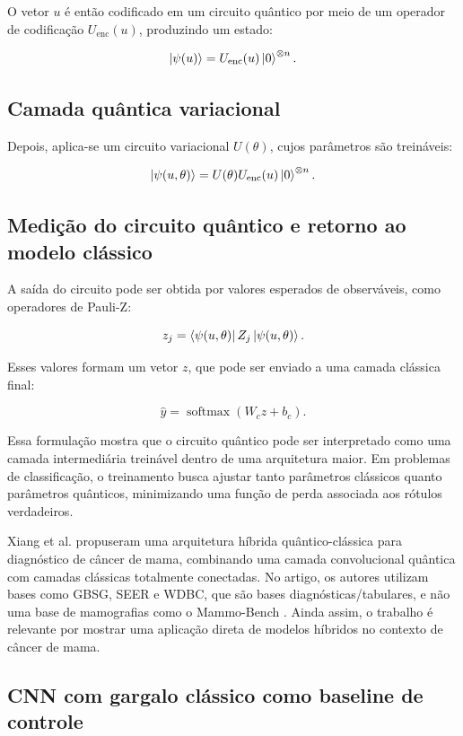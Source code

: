 \documentclass[
    12pt,
    openright,
    oneside,
    a4paper,
    english,
    brazil
]{abntex2}
\begin{document}
O vetor \(u\) é então codificado em um circuito quântico por meio de um operador de codificação \(U_{\text{enc}}(u)\), produzindo um estado:

\[
\ket{\psi(u)}
=
U_{\text{enc}}(u)
\ket{0}^{\otimes n}.
\]

\subsection{Camada quântica variacional}
\label{subsec:camada_quantica_variacional}

Depois, aplica-se um circuito variacional \(U(\theta)\), cujos parâmetros são treináveis:

\[
\ket{\psi(u,\theta)}
=
U(\theta)
U_{\text{enc}}(u)
\ket{0}^{\otimes n}.
\]

\subsection{Medição do circuito quântico e retorno ao modelo clássico}
\label{subsec:medicao_retorno_modelo_classico}

A saída do circuito pode ser obtida por valores esperados de observáveis, como operadores de Pauli-Z:

\[
z_j =
\bra{\psi(u,\theta)}
Z_j
\ket{\psi(u,\theta)}.
\]

Esses valores formam um vetor \(z\), que pode ser enviado a uma camada clássica final:

\[
\hat{y}
=
\operatorname{softmax}(W_c z + b_c).
\]

Essa formulação mostra que o circuito quântico pode ser interpretado como uma camada intermediária treinável dentro de uma arquitetura maior. Em problemas de classificação, o treinamento busca ajustar tanto parâmetros clássicos quanto parâmetros quânticos, minimizando uma função de perda associada aos rótulos verdadeiros.

Xiang et al. propuseram uma arquitetura híbrida quântico-clássica para diagnóstico de câncer de mama, combinando uma camada convolucional quântica com camadas clássicas totalmente conectadas. No artigo, os autores utilizam bases como GBSG, SEER e WDBC, que são bases diagnósticas/tabulares, e não uma base de mamografias como o Mammo-Bench \cite{xiang2024qccnn}. Ainda assim, o trabalho é relevante por mostrar uma aplicação direta de modelos híbridos no contexto de câncer de mama.

\subsection{CNN com gargalo clássico como baseline de controle}
\label{subsec:cnn_gargalo_baseline}
\end{document}
